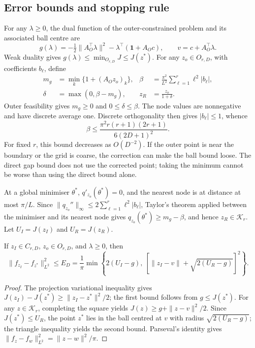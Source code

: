 \subsection{Error bounds and stopping rule}
For any \(\lambda\ge0\), the dual function of the outer-constrained problem and its associated ball centre are
\begin{equation}
g(\lambda)=-\tfrac12\|A_O^\top\lambda\|^2-\lambda^\top(\mathbf1+A_Oc),\qquad v=c+A_O^\top\lambda.
\label{eq:dual}
\end{equation}
Weak duality gives \(g(\lambda)\le\min_{O_{r,D}}J\le J(z^*)\). For any \(z_o\in O_{r,D}\), with coefficients \(b_\ell\), define
\begin{equation}
\begin{aligned}
m_g &= \min_k\{1+(A_Oz_o)_k\}, & \beta &= \frac{\pi^2}{L^2}\sum_{\ell=1}^r \ell^2|b_\ell|,\\
\delta &= \max(0,\beta-m_g), & z_R &= \frac{z_o}{1+\delta}.
\end{aligned}
\label{eq:repair}
\end{equation}
Outer feasibility gives \(m_g\ge0\) and \(0\le\delta\le\beta\). The node values are nonnegative and have discrete average one. Discrete orthogonality then gives \(|b_\ell|\le1\), whence
\[
\beta\le\frac{\pi^2 r(r+1)(2r+1)}{6(2D+1)^2}.
\]
For fixed \(r\), this bound decreases as \(O(D^{-2})\). If the outer point is near the boundary or the grid is coarse, the correction can make the ball bound loose. The direct gap bound does not use the corrected point; taking the minimum cannot be worse than using the direct bound alone.

At a global minimiser \(\theta^*\), \(q'_{z_o}(\theta^*)=0\), and the nearest node is at distance at most \(\pi/L\). Since \(\|q_{z_o}''\|_\infty\le2\sum_{\ell=1}^r\ell^2|b_\ell|\), Taylor's theorem applied between the minimiser and its nearest node gives \(q_{z_o}(\theta^*)\ge m_g-\beta\), and hence \(z_R\in\mathcal K_r\). Let \(U_I=J(z_I)\) and \(U_R=J(z_R)\).

\begin{proposition}\label{prop:certificate}
If \(z_I\in C_{r,D}\), \(z_o\in O_{r,D}\), and \(\lambda\ge0\), then
\begin{equation}
\|f_{z_I}-f_{z^*}\|_{L^2}^2\le E_D
=\frac1\pi\min\left\{2(U_I-g),\ \left[\|z_I-v\|+\sqrt{2(U_R-g)}\right]^2\right\}.
\label{eq:certificate}
\end{equation}
\end{proposition}
\begin{proof}
The projection variational inequality gives \(J(z_I)-J(z^*)\ge\|z_I-z^*\|^2/2\); the first bound follows from \(g\le J(z^*)\). For any \(z\in\mathcal K_r\), completing the square yields \(J(z)\ge g+\|z-v\|^2/2\). Since \(J(z^*)\le U_R\), the point \(z^*\) lies in the ball centred at \(v\) with radius \(\sqrt{2(U_R-g)}\); the triangle inequality yields the second bound. Parseval's identity gives \(\|f_z-f_w\|_{L^2}^2=\|z-w\|^2/\pi\).
\end{proof}

